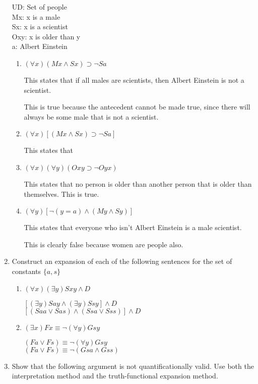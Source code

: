 \documentclass[12pt,letterpaper]{article}
\begin{document}
\begin{enumerate}
      UD: Set of people \\
      Mx: x is a male \\
      Sx: x is a scientist \\
      Oxy: x is older than y \\
      a: Albert Einstein

      \begin{enumerate}
        \item $(\forall x)(Mx \land Sx) \supset \neg Sa$

          This states that if all males are scientists,
          then Albert Einstein is not a scientist.

          This is true because the antecedent cannot be made true,
          since there will always be some male that is not a scientist.
        \item $(\forall x)[(Mx \land Sx) \supset \neg Sa]$

          This states that
        \item $(\forall x)(\forall y)(Oxy \supset \neg Oyx)$

          This states that no person is older than another person that is older than themselves.
          This is true.
        \item $(\forall y)[\neg (y = a) \land (My \land Sy)]$

          This states that everyone who isn't Albert Einstein is a male scientist.

          This is clearly false because women are people also.
      \end{enumerate}
    \item Construct an expansion of each of the following sentences for the set of constants $\{ a, s \}$
      \begin{enumerate}
        \item $(\forall x)(\exists y)Sxy \land D$

          $[(\exists y)Say \land (\exists y)Ssy] \land D$ \\
          $[(Saa \lor Sas) \land (Ssa \lor Sss)] \land D$
        \item $(\exists x)Fx \equiv \neg (\forall y)Gsy$

          $(Fa \lor Fs) \equiv \neg (\forall y)Gsy$ \\
          $(Fa \lor Fs) \equiv \neg (Gsa \land Gss)$
      \end{enumerate}
    \item
      Show that the following argument is not quantificationally valid.
      Use both the interpretation method and the truth-functional expansion method.


\end{enumerate}
\end{document}
